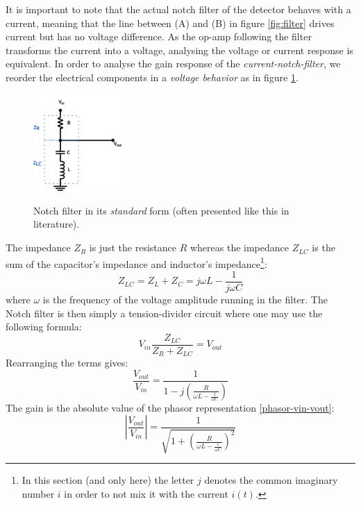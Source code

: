 \documentclass[10pt]{report}
\begin{document}
It is important to note that the actual notch filter of the detector behaves with a current, meaning that the line between (A) and (B) in figure \ref{fig:filter} drives current but has no voltage difference. As the op-amp following the filter transforms the current into a voltage, analysing the voltage or current response is equivalent. In order to analyse the gain response of the \textit{current-notch-filter}, we reorder the electrical components in a \textit{voltage behavior} as in figure \ref{fig:notch-tension}.
\begin{figure}[h!]
\caption{Notch filter in its \textit{standard} form (often presented like this in literature).}
\centering
\includegraphics[width=0.3\textwidth]{notch-tension}
\label{fig:notch-tension}
\end{figure}
The impedance $Z_R$ is just the resistance $R$ whereas the impedance $Z_{LC}$ is the sum of the capacitor's impedance and inductor's impedance\footnote{In this section (and only here) the letter $j$ denotes the common imaginary number $i$ in order to not mix it with the current $i(t)$.}:
\begin{equation}
Z_{LC} = Z_{L} + Z_{C} = j\omega L - \frac{1}{j\omega C}
\end{equation}
where $\omega$ is the frequency of the voltage amplitude running in the filter. The Notch filter is then simply a tension-divider circuit where one may use the following formula:
\begin{equation}
V_{in}\frac{Z_{LC}}{Z_{R} + Z_{LC}} = V_{out}
\end{equation}
Rearranging the terms gives:
\begin{equation}
\frac{V_{out}}{V_{in}} = \frac{1}{1 - j\left( \frac{R}{\omega L - \frac{1}{\omega C}} \right)}
\label{phasor-vin-vout}
\end{equation}
The gain is the absolute value of the phasor representation \ref{phasor-vin-vout}:
\begin{equation}
\left\vert \frac{V_{out}}{V_{in}} \right\vert = \frac{1}{\sqrt{1 + \left( \frac{R}{\omega L - \frac{1}{\omega C}} \right)^2}}
\label{phasor-vin-vout}
\end{equation}
\end{document}
